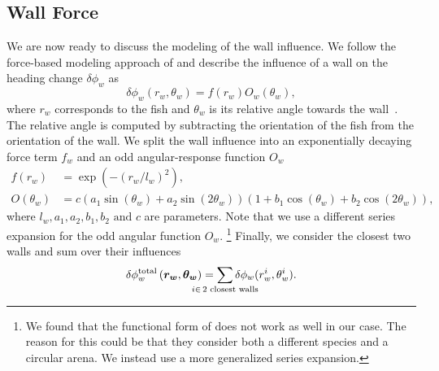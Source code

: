 \documentclass[nobib, a4paper]{tufte-handout}
\begin{document}
\subsection{Wall Force}
We are now ready to discuss the modeling of the wall influence.
We follow the force-based modeling approach of \citeauthor{calovi} and describe the influence of a wall on the heading change \(\delta \phi_w\) as
\begin{equation*}
  \delta \phi_w (r_w, \theta_w) = f(r_w)O_w(\theta_w),
\end{equation*}
where $r_w$ corresponds to the fish and $\theta_w$ is its relative angle towards the wall~\autocite{calovi}.
The relative angle is computed by subtracting the orientation of the fish from the orientation of the wall.
We split the wall influence into an exponentially decaying force term \(f_w\) and an odd angular-response function \(O_w\)
\begin{align*}
  f(r_w) &= \exp \left( -{(r_w/l_w)}^2 \right), \\
  O(\theta_w) &= c \left(a_1 \sin(\theta_w) + a_2 \sin(2  \theta_w)  \right)  \left(1 +  b_1  \cos(\theta_w) + b_2 \cos(2  \theta_w) \right),
\end{align*}
where $l_w, a_1, a_2, b_1, b_2 \text{ and } c$ are parameters.
Note that we use a different series expansion for the odd angular function \(O_w\).%
\footnote{We found that the functional form of \citeauthor{calovi} does not work as well in our case.
  The reason for this could be that they consider both a different species and a circular arena.
We instead use a more generalized series expansion.}
Finally, we consider the closest two walls and sum over their influences
\begin{equation*}
 \delta \phi_w^{\text{total}} \left( \bm{r_w}, \bm{\theta_w} \right) = \sum_{\mathclap{i \in \, 2 \text{ closest walls}}} \delta \phi_w (r_w^i, \theta_w^i).
\end{equation*}
\end{document}
